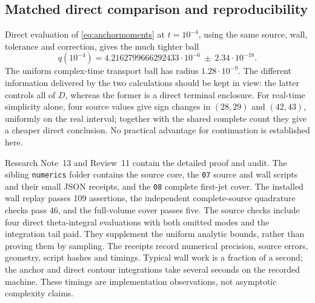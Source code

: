 \subsection{Matched direct comparison and reproducibility}
Direct evaluation of \eqref{eq:anchormoments} at \(t=10^{-4}\), using
the same source, wall, tolerance and correction, gives the much tighter
ball
\[
 q(10^{-4})=
 4.2162799666292433\cdot10^{-6}\ \pm\ 2.34\cdot10^{-18}.
\]
The uniform complex-time transport ball has radius
\(1.28\cdot10^{-9}\). The different information delivered by the two
calculations should be kept in view: the latter controls all of \(D\),
whereas the former is a direct terminal enclosure. For real-time
simplicity alone, four source values give sign changes in \((28,29)\)
and \((42,43)\), uniformly on the real interval; together with the
shared complete count they give a cheaper direct conclusion.
No practical advantage for continuation is established here.

Research Note~13 and Review~11 contain the detailed proof and audit.
The sibling \texttt{numerics} folder contains the source core,
the \texttt{07} source and wall scripts and their small JSON receipts,
and the \texttt{08} complete first-jet cover. The installed wall replay
passes 109 assertions, the independent complete-source quadrature
checks pass 46, and the full-volume cover passes five. The source checks
include four direct theta-integral evaluations with both omitted modes
and the integration tail paid. They supplement the uniform analytic
bounds, rather than proving them by sampling.
The receipts record numerical precision, source errors, geometry,
script hashes and timings. Typical wall work is a fraction of a second;
the anchor and direct contour integrations take several seconds on the
recorded machine. These timings are implementation observations, not
asymptotic complexity claims.
